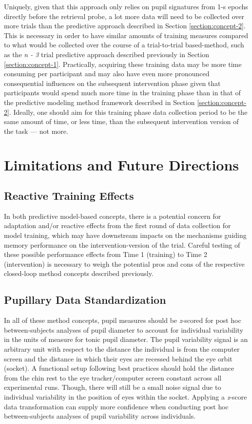 Uniquely, given that this approach only relies on pupil signatures from 1-s epochs directly before the retrieval probe, a lot more data will need to be collected over more trials than the predictive approach described in Section \ref{section:concept-2}. This is necessary in order to have similar amounts of training measures compared to what would be collected over the course of a trial-to-trial based-method, such as the \emph{n - 3} trial predictive approach described previously in Section \ref{section:concept-1}. Practically, acquiring these training data may be more time consuming per participant and may also have even more pronounced consequential influences on the subsequent intervention phase given that participants would spend much more time in the training phase than in that of the predictive modeling method framework described in Section \ref{section:concept-2}. Ideally, one should aim for this training phase data collection period to be the same amount of time, or less time, than the subsequent intervention version of the task --- not more.

\section{Limitations and Future Directions}
\subsection{Reactive Training Effects}
In both predictive model-based concepts, there is a potential concern for adaptation and/or reactive effects from the first round of data collection for model training, which may have downstream impacts on the mechanisms guiding memory performance on the intervention-version of the trial. Careful testing of these possible performance effects from Time 1 (training) to Time 2 (intervention) is necessary to weigh the potential pros and cons of the respective closed-loop method concepts described previously.

\subsection{Pupillary Data Standardization}
In all of these method concepts, pupil measures should be \emph{z}-scored for post hoc between-subjects analyses of pupil diameter to account for individual variability in the units of measure for tonic pupil diameter. The pupil variability signal is an arbitrary unit with respect to the distance the individual is from the computer screen and the distance in which their eyes are recessed behind the eye orbit (socket). A functional setup following best practices should hold the distance from the chin rest to the eye tracker/computer screen constant across all experimental runs. Though, there will still be a small noise signal due to individual variability in the position of eyes within the socket. Applying a \emph{z}-score data transformation can supply more confidence when conducting post hoc between-subjects analyses of pupil variability across individuals.

